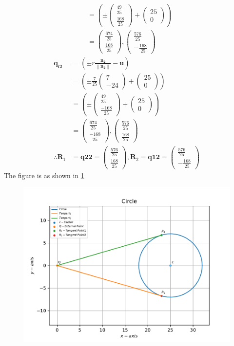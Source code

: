 \documentclass[12pt]{article}
\providecommand{\brak}[1]{\ensuremath{\left(#1\right)}}
\providecommand{\norm}[1]{\left\lVert#1\right\rVert}
\newcommand{\myvec}[1]{\ensuremath{\begin{pmatrix}#1\end{pmatrix}}}
\let\vec\mathbf
\begin{document}
\begin{enumerate}
\begin{align}
	&= \brak{\pm \myvec{\frac{49}{25} \\ \frac{168}{25}} + \myvec{25 \\ 0}} \\
	&= \myvec{\frac{674}{25} \\ \frac{168}{25}}, \myvec{\frac{576}{25} \\ -\frac{168}{25}}
\end{align}
\begin{align}
	\vec{q_{i2}} &= \brak{\pm r \frac{\vec{n_2}}{\norm{\vec{n_2}}}- \vec{u}} \\
	&= \brak{\pm \frac{7}{25}\myvec{7 \\ -24}+ \myvec{25 \\ 0}} \\
	&= \brak{\pm \myvec{\frac{49}{25} \\ \frac{-168}{25}} + \myvec{25 \\ 0}} \\
	&= \myvec{\frac{674}{25} \\ \frac{-168}{25}}, \myvec{\frac{576}{25} \\ \frac{168}{25}}  \\
	\therefore \vec{R}_1 &= \vec{q{22}} = \myvec{\frac{576}{25} \\ \frac{168}{25}}, \vec{R}_2 = \vec{q{12}} = \myvec{\frac{576}{25} \\ -\frac{168}{25}}
\end{align}
The figure is as shown in \ref{fig:Fig1}
\begin{figure}[!h]
	\begin{center}
		\includegraphics[width=\columnwidth]{./figs/problem1.pdf}
	\end{center}
\caption{}
\label{fig:Fig1}
\end{figure}
\end{enumerate}
\end{document}
